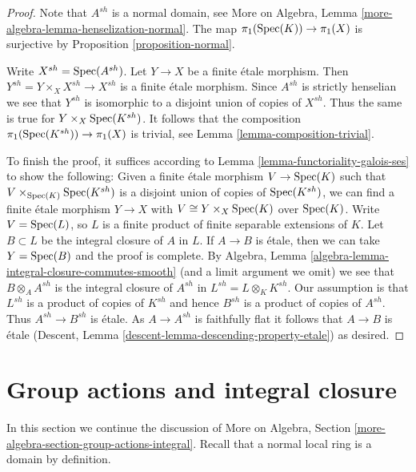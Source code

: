 \begin{proof}
Note that $A^{sh}$ is a normal domain, see
More on Algebra, Lemma \ref{more-algebra-lemma-henselization-normal}.
The map $\pi_1(\mathop{\mathrm{Spec}}(K)) \to \pi_1(X)$ is surjective by
Proposition \ref{proposition-normal}.

\medskip\noindent
Write $X^{sh} = \mathop{\mathrm{Spec}}(A^{sh})$. Let $Y \to X$ be a finite \'etale morphism.
Then $Y^{sh} = Y \times_X X^{sh} \to X^{sh}$ is a finite \'etale morphism.
Since $A^{sh}$ is strictly henselian we see that $Y^{sh}$ is isomorphic
to a disjoint union of copies of $X^{sh}$. Thus the same is true for
$Y \times_X \mathop{\mathrm{Spec}}(K^{sh})$. It follows that the composition
$\pi_1(\mathop{\mathrm{Spec}}(K^{sh})) \to \pi_1(X)$ is trivial, see
Lemma \ref{lemma-composition-trivial}.

\medskip\noindent
To finish the proof, it suffices according to
Lemma \ref{lemma-functoriality-galois-ses}
to show the following: Given a finite \'etale morphism
$V \to \mathop{\mathrm{Spec}}(K)$ such that $V \times_{\mathop{\mathrm{Spec}}(K)} \mathop{\mathrm{Spec}}(K^{sh})$
is a disjoint union of copies of $\mathop{\mathrm{Spec}}(K^{sh})$, we can find a
finite \'etale morphism
$Y \to X$ with $V \cong Y \times_X \mathop{\mathrm{Spec}}(K)$ over $\mathop{\mathrm{Spec}}(K)$.
Write $V = \mathop{\mathrm{Spec}}(L)$, so $L$ is a finite product of
finite separable extensions of $K$.
Let $B \subset L$ be the integral closure of $A$ in $L$.
If $A \to B$ is \'etale, then we can take $Y = \mathop{\mathrm{Spec}}(B)$
and the proof is complete. By
Algebra, Lemma \ref{algebra-lemma-integral-closure-commutes-smooth}
(and a limit argument we omit)
we see that $B \otimes_A A^{sh}$ is the integral closure of
$A^{sh}$ in $L^{sh} = L \otimes_K K^{sh}$.
Our assumption is that $L^{sh}$ is a product of copies of
$K^{sh}$ and hence $B^{sh}$ is a product of copies of $A^{sh}$.
Thus $A^{sh} \to B^{sh}$ is \'etale. As $A \to A^{sh}$ is
faithfully flat it follows that $A \to B$ is \'etale
(Descent, Lemma \ref{descent-lemma-descending-property-etale})
as desired.
\end{proof}







\section{Group actions and integral closure}
\label{section-group-actions-integral}

\noindent
In this section we continue the discussion of
More on Algebra, Section \ref{more-algebra-section-group-actions-integral}.
Recall that a normal local ring is a domain by definition.

